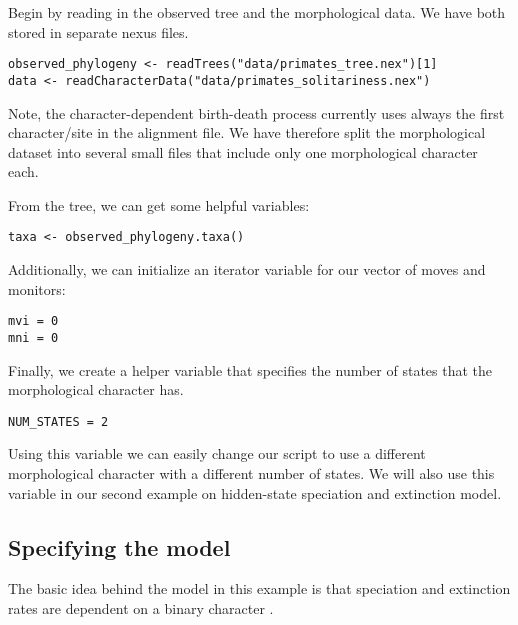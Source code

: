 Begin by reading in the observed tree and the morphological data. 
We have both stored in separate nexus files.
{\tt \begin{snugshade*}
\begin{lstlisting}
observed_phylogeny <- readTrees("data/primates_tree.nex")[1]
data <- readCharacterData("data/primates_solitariness.nex")
\end{lstlisting}
\end{snugshade*}}
Note, the character-dependent birth-death process currently uses always the first character/site in the alignment file.
We have therefore split the morphological dataset into several small files that include only one morphological character each.

From the tree, we can get some helpful variables:
{\tt \begin{snugshade*}
\begin{lstlisting}
taxa <- observed_phylogeny.taxa()
\end{lstlisting}
\end{snugshade*}}

Additionally, we can initialize an iterator variable for our vector of moves and monitors:
{\tt \begin{snugshade*}
\begin{lstlisting}
mvi = 0
mni = 0
\end{lstlisting}
\end{snugshade*}}

Finally, we create a helper variable that specifies the number of states that the morphological character has.
{\tt \begin{snugshade*}
\begin{lstlisting}
NUM_STATES = 2
\end{lstlisting}
\end{snugshade*}}
Using this variable we can easily change our script to use a different morphological character with a different number of states.
We will also use this variable in our second example on hidden-state speciation and extinction model. 



\subsection{Specifying the model}

The basic idea behind the model in this example is that speciation and extinction rates are dependent on a binary character \citep{Maddison2007}.


